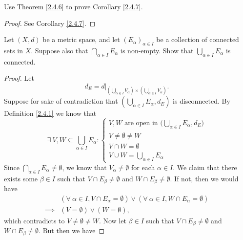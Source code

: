 \begin{exercise}\label{ex 2.4.5}
    Use Theorem \ref{2.4.6} to prove Corollary \ref{2.4.7}.
\end{exercise}

\begin{proof}
    See Corollary \ref{2.4.7}.
\end{proof}

\begin{exercise}\label{ex 2.4.6}
    Let \((X, d)\) be a metric space, and let \((E_\alpha)_{\alpha \in I}\) be a collection of connected sets in \(X\).
    Suppose also that \(\bigcap_{\alpha \in I} E_\alpha\) is non-empty.
    Show that \(\bigcup_{\alpha \in I} E_\alpha\) is connected.
\end{exercise}

\begin{proof}
    Let
    \[
        d_E = d|_{(\bigcup_{\alpha \in I} V_\alpha) \times (\bigcup_{\alpha \in I} V_\alpha)}.
    \]
    Suppose for sake of contradiction that \((\bigcup_{\alpha \in I} E_\alpha, d_E)\) is disconnected.
    By Definition \ref{2.4.1} we know that
    \[
        \exists\ V, W \subseteq \bigcup_{\alpha \in I} E_\alpha : \begin{cases}
            V, W \text{ are open in } \bigg(\bigcup_{\alpha \in I} E_\alpha, d_E\bigg) \\
            V \neq \emptyset \neq W                                                    \\
            V \cap W = \emptyset                                                       \\
            V \cup W = \bigcup_{\alpha \in I} E_\alpha
        \end{cases}
    \]
    Since \(\bigcap_{\alpha \in I} E_\alpha \neq \emptyset\), we know that \(V_\alpha \neq \emptyset\) for each \(\alpha \in I\).
    We claim that there exists some \(\beta \in I\) such that \(V \cap E_\beta \neq \emptyset\) and \(W \cap E_\beta \neq \emptyset\).
    If not, then we would have
    \begin{align*}
                 & (\forall\ \alpha \in I, V \cap E_\alpha = \emptyset) \lor (\forall\ \alpha \in I, W \cap E_\alpha = \emptyset) \\
        \implies & (V = \emptyset) \lor (W = \emptyset),
    \end{align*}
    which contradicts to \(V \neq \emptyset \neq W\).
    Now let \(\beta \in I\) such that \(V \cap E_\beta \neq \emptyset\) and \(W \cap E_\beta \neq \emptyset\).
    But then we have

\end{proof}
